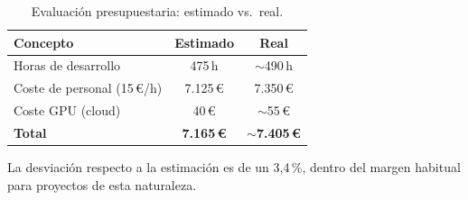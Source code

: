 \begin{table}[htbp]
  \centering
  \caption{Evaluación presupuestaria: estimado vs.\ real.}
  \label{tab:presupuesto}
  \begin{tabular}{lcc}
    \toprule
    \textbf{Concepto} & \textbf{Estimado} & \textbf{Real} \\
    \midrule
    Horas de desarrollo           & 475\,h    & $\sim$490\,h \\
    Coste de personal (15\,€/h)   & 7.125\,€  & 7.350\,€ \\
    Coste GPU (cloud)             & 40\,€     & $\sim$55\,€ \\
    \midrule
    \textbf{Total}                & \textbf{7.165\,€} & \textbf{$\sim$7.405\,€} \\
    \bottomrule
  \end{tabular}
\end{table}

La desviación respecto a la estimación es de un 3,4\,\%, dentro del margen habitual para proyectos
de esta naturaleza.
